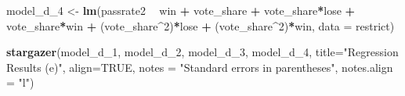 \documentclass[
  12pt,
  landscape]{article}
\newenvironment{Shaded}{\begin{snugshade}}{\end{snugshade}}
\newcommand{\DataTypeTok}[1]{\textcolor[rgb]{0.13,0.29,0.53}{#1}}
\newcommand{\DecValTok}[1]{\textcolor[rgb]{0.00,0.00,0.81}{#1}}
\newcommand{\KeywordTok}[1]{\textcolor[rgb]{0.13,0.29,0.53}{\textbf{#1}}}
\newcommand{\NormalTok}[1]{#1}
\newcommand{\OperatorTok}[1]{\textcolor[rgb]{0.81,0.36,0.00}{\textbf{#1}}}
\newcommand{\OtherTok}[1]{\textcolor[rgb]{0.56,0.35,0.01}{#1}}
\newcommand{\StringTok}[1]{\textcolor[rgb]{0.31,0.60,0.02}{#1}}
\begin{document}
\begin{Shaded}
\begin{Highlighting}[]
\NormalTok{model_d_}\DecValTok{4}\NormalTok{ <-}\StringTok{ }\KeywordTok{lm}\NormalTok{(passrate2 }\OperatorTok{~}\StringTok{ }\NormalTok{win }\OperatorTok{+}\StringTok{ }\NormalTok{vote_share }\OperatorTok{+}\StringTok{ }\NormalTok{vote_share}\OperatorTok{*}\NormalTok{lose }\OperatorTok{+}\StringTok{ }\NormalTok{vote_share}\OperatorTok{*}\NormalTok{win }\OperatorTok{+}\StringTok{ }\NormalTok{(vote_share}\OperatorTok{^}\DecValTok{2}\NormalTok{)}\OperatorTok{*}\NormalTok{lose }\OperatorTok{+}\StringTok{ }\NormalTok{(vote_share}\OperatorTok{^}\DecValTok{2}\NormalTok{)}\OperatorTok{*}\NormalTok{win, }\DataTypeTok{data =}\NormalTok{ restrict)}

\KeywordTok{stargazer}\NormalTok{(model_d_}\DecValTok{1}\NormalTok{, model_d_}\DecValTok{2}\NormalTok{, model_d_}\DecValTok{3}\NormalTok{, model_d_}\DecValTok{4}\NormalTok{, }\DataTypeTok{title=}\StringTok{"Regression Results (e)"}\NormalTok{, }\DataTypeTok{align=}\OtherTok{TRUE}\NormalTok{, }\DataTypeTok{notes =} \StringTok{"Standard errors in parentheses"}\NormalTok{, }\DataTypeTok{notes.align =} \StringTok{"l"}\NormalTok{)}
\end{Highlighting}
\end{Shaded}
\end{document}
